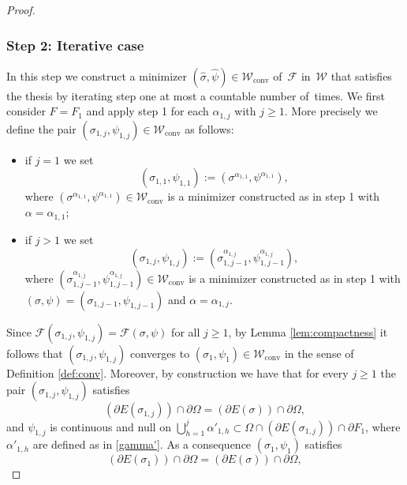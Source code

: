 \documentclass[11pt]{article}
\numberwithin{equation}{section}
\let\Om\Omega
\newcommand\admclassconv{{\mathcal W_\mathrm{conv}}}
\theoremstyle{definition}
\begin{document}
\begin{proof}
\subsubsection*{Step 2: Iterative case} In this step we construct a minimizer $(\widehat\sigma,\widehat\psi)\in\admclassconv$ of~$\mathcal F$ in~$\mathcal W$ that satisfies the thesis by iterating step one at most a countable number of~times.
We first consider $F=F_1$ and apply step 1 for each $\alpha_{1,j}$ with $j\ge1$.
More precisely we define the pair $(\sigma_{1,j},\psi_{1,j})\in\admclassconv$ as follows:
\begin{itemize}
\item if $j=1$ we set\vspace*{-3pt}
\begin{equation*}
(\sigma_{1,1},\psi_{1,1}):=(\sigma^{\alpha_{1,1}},\psi^{\alpha_{1,1}} ),
\end{equation*}
where $(\sigma^{\alpha_{1,1}},\psi^{\alpha_{1,1}} )\in\admclassconv$ is a minimizer constructed as in step 1 with $\alpha=\alpha_{1,1}$;
\item if $j>1$ we set\vspace*{-3pt}
\begin{equation*}
(\sigma_{1,j},\psi_{1,j}):= (\sigma_{1,j-1}^{\alpha_{1,j}},\psi_{1,j-1}^{{\alpha}_{1,j}}),
\end{equation*}
where $(\sigma_{1,j-1}^{\alpha_{1,j}},\psi_{1,j-1}^{{\alpha}_{1,j}})\in\admclassconv$ is a minimizer constructed as in step 1 with $(\sigma,\psi)=(\sigma_{1,j-1},\psi_{1,j-1})$ and $\alpha=\alpha_{1,j}$.
\end{itemize}
Since
$
\mathcal{F}(\sigma_{1,j},\psi_{1,j})=\mathcal F(\sigma,\psi)
$
for all $j\ge1$, by Lemma \ref{lem:compactness} it follows that $(\sigma_{1,j},\psi_{1,j})$ converges to $(\sigma_1,\psi_1)\in\admclassconv$ in the sense of Definition \ref{def:conv}. Moreover, by construction we have that for every $j\ge1$ the pair $(\sigma_{1,j},\psi_{1,j})$ satisfies
\begin{equation*}
(\partial E(\sigma_{1,j}))\cap\partial\Om= (\partial E(\sigma))\cap\partial\Om,
\end{equation*}
and $\psi_{1,j}$ is continuous and null on $\bigcup_{h=1}^j\alpha'_{1,h}\subset \Om\cap(\partial E(\sigma_{1,j}))\cap\partial F_1$,
where $\alpha'_{1,h}$ are defined as in \eqref{gamma'}. As a consequence $(\sigma_1,\psi_1)$ satisfies
\begin{equation*}
(\partial E(\sigma_{1}))\cap\partial\Om= (\partial E(\sigma))\cap\partial\Om,
\end{equation*}

\end{proof}
\end{document}
